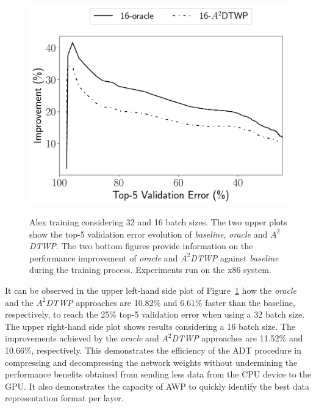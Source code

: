 \begin{figure}[!bhtp]
{{            \includegraphics[scale=0.450]{bitpack/figs/alex/small_3/alexnet_train_improvement_agg_top5_16-baseline.pdf}
        }
    }
    \caption{Alex training considering 32 and 16 batch sizes. The two upper 
    plots show the top-5 validation error evolution of
    \textit{baseline}, \textit{oracle} and \textit{$A^2$DTWP}.
    The two bottom figures provide information on the performance improvement of
    \textit{oracle} and \textit{$A^2$DTWP} against \textit{baseline} during the
    training process. Experiments run on the x86 system.
    }
    \label{alex_improv}
\end{figure}


It can be observed in the upper left-hand side plot of Figure~\ref{alex_improv} 
how the \textit{oracle} and the \textit{$A^2$DTWP} approaches are 10.82\% and 
6.61\% faster than the baseline, respectively, to reach the 25\% top-5 
validation error when using a 32 batch size.
The upper right-hand side plot shows results considering a 16 batch size.  The 
improvements achieved by the \textit{oracle} and \textit{$A^2$DTWP} approaches 
are 11.52\% and 10.66\%, respectively.
This demonstrates the efficiency of the ADT procedure in compressing and 
decompressing the network weights without undermining the performance benefits 
obtained from sending less data
from the CPU device to the GPU.
It also demonstrates the capacity of AWP to quickly identify the best data 
representation format per layer.

